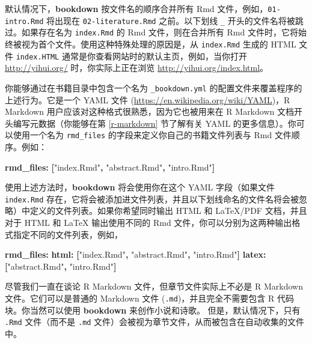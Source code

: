 \documentclass[
  12pt,
]{krantz}
\newenvironment{Shaded}{\begin{snugshade}}{\end{snugshade}}
\newcommand{\AttributeTok}[1]{\textcolor[rgb]{0.13,0.29,0.53}{#1}}
\newcommand{\FunctionTok}[1]{\textcolor[rgb]{0.13,0.29,0.53}{\textbf{#1}}}
\newcommand{\KeywordTok}[1]{\textcolor[rgb]{0.13,0.29,0.53}{\textbf{#1}}}
\newcommand{\StringTok}[1]{\textcolor[rgb]{0.31,0.60,0.02}{#1}}
\theoremstyle{definition}
\theoremstyle{definition}
\theoremstyle{definition}
\theoremstyle{definition}
\theoremstyle{remark}
\begin{document}
默认情况下，\textbf{bookdown} 按文件名的顺序合并所有 Rmd 文件，例如，\texttt{01-intro.Rmd} 将出现在 \texttt{02-literature.Rmd} 之前。以下划线 \texttt{\_} 开头的文件名将被跳过。如果存在名为 \texttt{index.Rmd} 的 Rmd 文件，则在合并所有 Rmd 文件时，它将始终被视为首个文件。使用这种特殊处理的原因是，从 \texttt{index.Rmd} 生成的 HTML 文件 \texttt{index.HTML} 通常是你查看网站时的默认主页，例如，当你打开 \url{http://yihui.org/} 时，你实际上正在浏览 \url{http://yihui.org/index.html}。

你能够通过在书籍目录中包含一个名为 \texttt{\_bookdown.yml} 的配置文件来覆盖程序的上述行为。它是一个 YAML 文件 (\url{https://en.wikipedia.org/wiki/YAML})，R Markdown 用户应该对这种格式很熟悉，因为它也被用来在 R Markdown 文档开头编写元数据（你能够在第 \ref{r-markdown} 节了解有关 YAML 的更多信息）。你可以使用一个名为 \texttt{rmd\_files} 的字段来定义你自己的书籍文件列表与 Rmd 文件顺序。例如：

\begin{Shaded}
\begin{Highlighting}[]
\FunctionTok{rmd\_files}\KeywordTok{:}\AttributeTok{ }\KeywordTok{[}\StringTok{"index.Rmd"}\KeywordTok{,}\AttributeTok{ }\StringTok{"abstract.Rmd"}\KeywordTok{,}\AttributeTok{ }\StringTok{"intro.Rmd"}\KeywordTok{]}
\end{Highlighting}
\end{Shaded}

使用上述方法时，\textbf{bookdown} 将会使用你在这个 YAML 字段（如果文件 \texttt{index.Rmd} 存在，它将会被添加进文件列表，并且以下划线命名的文件名将会被忽略）中定义的文件列表。如果你希望同时输出 HTML 和 LaTeX/PDF 文档，并且对于 HTML 和 LaTeX 输出使用不同的 Rmd 文件，你可以分别为这两种输出格式指定不同的文件列表，例如，

\begin{Shaded}
\begin{Highlighting}[]
\FunctionTok{rmd\_files}\KeywordTok{:}
\AttributeTok{  }\FunctionTok{html}\KeywordTok{:}\AttributeTok{ }\KeywordTok{[}\StringTok{"index.Rmd"}\KeywordTok{,}\AttributeTok{ }\StringTok{"abstract.Rmd"}\KeywordTok{,}\AttributeTok{ }\StringTok{"intro.Rmd"}\KeywordTok{]}
\AttributeTok{  }\FunctionTok{latex}\KeywordTok{:}\AttributeTok{ }\KeywordTok{[}\StringTok{"abstract.Rmd"}\KeywordTok{,}\AttributeTok{ }\StringTok{"intro.Rmd"}\KeywordTok{]}
\end{Highlighting}
\end{Shaded}

尽管我们一直在谈论 R Markdown 文件，但章节文件实际上不必是 R Markdown 文件。它们可以是普通的 Markdown 文件 (\texttt{.md})，并且完全不需要包含 R 代码块。你当然可以使用 \textbf{bookdown} 来创作小说和诗歌。
但是，默认情况下，只有 \texttt{.Rmd} 文件（而不是 \texttt{.md} 文件）会被视为章节文件，从而被包含在自动收集的文件中。
\end{document}
